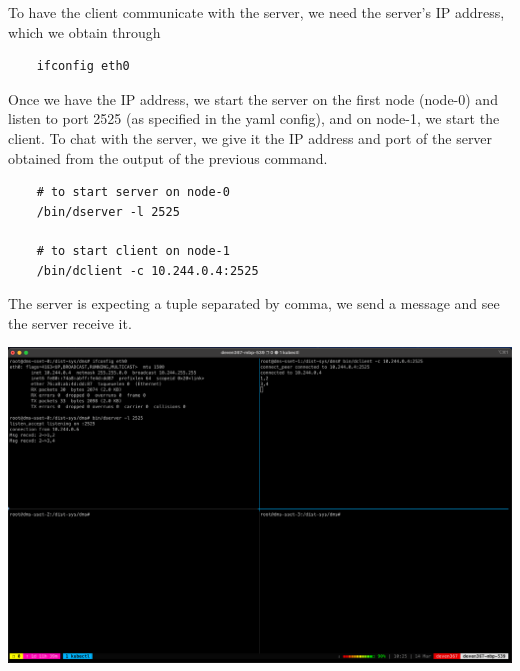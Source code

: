 \documentclass{article}
\begin{document}
To have the client communicate with the server, we need the server's IP address, which we obtain through

\begin{lstlisting}
    ifconfig eth0
\end{lstlisting}

Once we have the IP address, we start the server on the first node (node-0) and listen to port 2525 (as specified in the yaml config), and on node-1, we start the client. To chat with the server, we give it the IP address and port of the server obtained from the output of the previous command.

\begin{lstlisting}
    # to start server on node-0
    /bin/dserver -l 2525

    # to start client on node-1
    /bin/dclient -c 10.244.0.4:2525

\end{lstlisting}

The server is expecting a tuple separated by comma, we send a message and see the server receive it.

\includegraphics[scale=0.345]{final-output.png}
\end{document}
